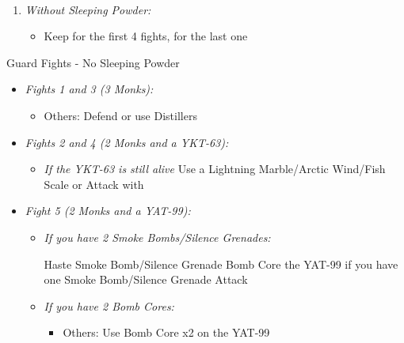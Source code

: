 \bothvfill
\lossvfill
\winvfill
\ 
\bothcb
\wincb
\losscb
\ 
\ \bothnewline \winnewline \lossnewline
\begin{enumerate}[resume]
	\item \textit{Without Sleeping Powder:}
		\begin{itemize}
			\item Keep \formation{\tidus}{\rikku}{\lulu} for the first 4 fights, \formation{\tidus}{\rikku}{\kimahri} for the last one
		\end{itemize}
\end{enumerate}
\begin{battle}{Guard Fights - No Sleeping Powder}
	\begin{itemize}
		\item \textit{Fights 1 and 3 (3 Monks):}
			\begin{itemize}
				\tidusf Attack
				\item Others: Defend or use Distillers
			\end{itemize}
		\item \textit{Fights 2 and 4 (2 Monks and a YKT-63):}
			\begin{itemize}
				\switch{\tidus}{\kimahri}
				\kimahrif Silence Grenade/Smoke Bomb
				\rikkuf Silence Grenade/Smoke Bomb
				\switch{\kimahri}{\tidus}
				\tidusf Attack the YKT-63
				\item \textit{If the YKT-63 is still alive} Use a Lightning Marble/Arctic Wind/Fish Scale or Attack with \tidus
			\end{itemize}
			\item \textit{Fight 5 (2 Monks and a YAT-99):}
			\begin{itemize}
				\item \textit{If you have 2 Smoke Bombs/Silence Grenades:}
					\begin{itemize}
						\tidusf Haste \rikku
						\rikkuf Smoke Bomb/Silence Grenade
						\rikkuf Bomb Core the YAT-99 if you have one
						\rikkuf Smoke Bomb/Silence Grenade
						\tidusf Attack
					\end{itemize}
				\item \textit{If you have 2 Bomb Cores:}
					\begin{itemize}
						\tidusf Attack the Monks
						\item Others: Use Bomb Core x2 on the YAT-99
					\end{itemize}
			\end{itemize}
	\end{itemize}
\end{battle}

